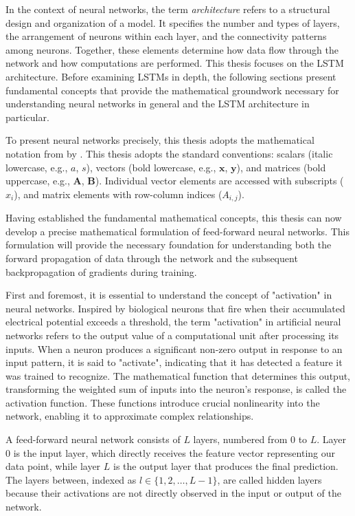 In the context of neural networks, the term \emph{architecture} refers to a structural design and organization of a model. It specifies the number and types of layers, the arrangement of neurons within each layer, and the connectivity patterns among neurons. Together, these elements determine how data flow through the network and how computations are performed. This thesis focuses on the LSTM architecture. Before examining LSTMs in depth, the following sections present fundamental concepts that provide the mathematical groundwork necessary for understanding neural networks in general and the LSTM architecture in particular.

To present neural networks precisely, this thesis adopts the mathematical notation from  by \textcite{goodfellow2016}. This thesis adopts the standard conventions: scalars (italic lowercase, e.g., \(a\), \(s\)), vectors (bold lowercase, e.g., \(\mathbf{x}\), \(\mathbf{y}\)), and matrices (bold uppercase, e.g., \(\mathbf{A}\), \(\mathbf{B}\)). Individual vector elements are accessed with subscripts (\(x_i\)), and matrix elements with row-column indices (\(A_{i,j}\)).

Having established the fundamental mathematical concepts, this thesis can now develop a precise mathematical formulation of feed-forward neural networks. This formulation will provide the necessary foundation for understanding both the forward propagation of data through the network and the subsequent backpropagation of gradients during training.

First and foremost, it is essential to understand the concept of "activation" in neural networks. Inspired by biological neurons that fire when their accumulated electrical potential exceeds a threshold, the term "activation" in artificial neural networks refers to the output value of a computational unit after processing its inputs. When a neuron produces a significant non-zero output in response to an input pattern, it is said to "activate", indicating that it has detected a feature it was trained to recognize. The mathematical function that determines this output, transforming the weighted sum of inputs into the neuron's response, is called the activation function. These functions introduce crucial nonlinearity into the network, enabling it to approximate complex relationships.

A feed-forward neural network consists of \(L\) layers, numbered from \(0\) to \(L\). Layer \(0\) is the input layer, which directly receives the feature vector representing our data point, while layer \(L\) is the output layer that produces the final prediction. The layers between, indexed as \(l \in \{1, 2, \ldots, L-1\}\), are called hidden layers because their activations are not directly observed in the input or output of the network.

